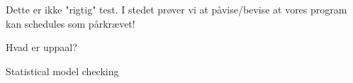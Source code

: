 
Dette er ikke "rigtig" test.
I stedet prøver vi at påvise/bevise at vores program kan schedules som pårkrævet!

Hvad er uppaal?

Statistical model checking
